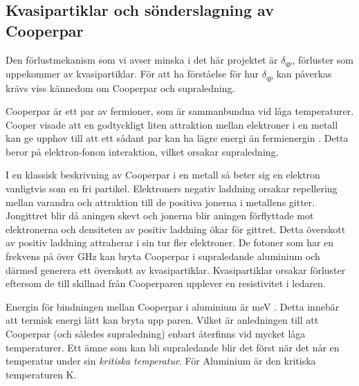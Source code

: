 \documentclass[main.tex]{subfiles}
\begin{document}
\subsection{Kvasipartiklar och sönderslagning av Cooperpar}
\label{sec:cooper}
Den förlustmekanism som vi avser minska i det här projektet är $\delta_{qp}$, förluster som uppekommer av kvasipartiklar. För att ha förståelse för hur $\delta_{qp}$ kan påverkas krävs viss kännedom om Cooperpar och supraledning.

Cooperpar är ett par av fermioner, som är sammanbundna vid låga temperaturer. Cooper visade att en godtyckligt liten attraktion mellan elektroner i en metall kan ge upphov till att ett sådant par kan ha lägre energi än fermienergin \cite{Kittel2005}. Detta beror på elektron-fonon interaktion, vilket orsakar supraledning.

I en klassisk beskrivning av Cooperpar i en metall så beter sig en elektron vanligtvis som en fri partikel. Elektroners negativ laddning orsakar repellering mellan varandra och attraktion till de positiva jonerna i metallens gitter. Jongittret blir då aningen skevt och jonerna blir aningen förflyttade mot elektronerna och densiteten av positiv laddning ökar för gittret. Detta överskott av positiv laddning attraherar i sin tur fler elektroner. De fotoner som har en frekvens på över \unit[88]{GHz} kan bryta Cooperpar i supraledande aluminium och därmed generera ett överskott av kvasipartiklar. Kvasipartiklar orsakar förluster eftersom de till skillnad från Cooperparen upplever en resistivitet i ledaren.

Energin för bindningen mellan Cooperpar i aluminium är \unit[0,39]{meV} \cite{Kittel2005}. Detta innebär att termisk energi lätt kan bryta upp paren. Vilket är anledningen till att Cooperpar (och således supraledning) enbart återfinns vid mycket låga temperaturer. Ett ämne som kan bli supraledande blir det först när det når en temperatur under sin \emph{kritiska temperatur}. För Aluminium är den kritiska temperaturen \unit[1,2]{K}.




\end{document}
